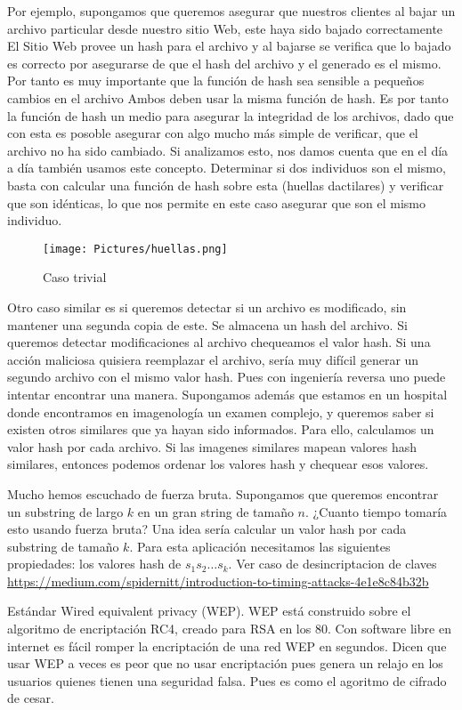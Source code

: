 Por ejemplo, supongamos que queremos asegurar que nuestros clientes al bajar un archivo particular desde nuestro sitio Web, este haya sido bajado correctamente
El Sitio Web provee un hash para el archivo y al bajarse se verifica que lo bajado es correcto por asegurarse de que el hash del archivo y el generado es el mismo.
Por tanto es muy importante que la función de hash sea sensible a pequeños cambios en el archivo
Ambos deben usar la misma función de hash.
Es por tanto la función de hash un medio para asegurar la integridad de los archivos, dado que con esta es posoble asegurar con algo mucho más simple de verificar, que el archivo no ha sido cambiado. 
Si analizamos esto, nos damos cuenta que en el día a día también usamos este concepto. Determinar si dos individuos son el mismo, basta con calcular una función de hash sobre esta (huellas dactilares) y verificar que son idénticas, lo que nos permite en este caso asegurar que son el mismo individuo. 
\begin{figure}[h!]
    \centering
    \texttt{[image: Pictures/huellas.png]}
    \caption{Caso trivial}
    \label{fig:my_label}
\end{figure}
Otro caso similar es si queremos detectar si un archivo es modificado, sin mantener una segunda copia de este. Se almacena un hash del archivo. Si queremos detectar modificaciones al archivo chequeamos el valor hash. Si una acción maliciosa quisiera reemplazar el archivo, sería muy difícil generar un segundo archivo con el mismo valor hash. Pues con ingeniería reversa uno puede intentar encontrar una manera. 
Supongamos además que estamos en un hospital donde encontramos en imagenología un examen complejo, y queremos saber si existen otros similares que ya hayan sido informados. Para ello, calculamos un valor hash por cada archivo. Si las imagenes similares mapean valores hash similares, entonces podemos ordenar los valores hash y chequear esos valores. 

Mucho hemos escuchado de fuerza bruta. Supongamos que queremos encontrar un substring de largo $k$ en un gran string de tamaño $n$. ¿Cuanto tiempo tomaría esto usando fuerza bruta? Una idea sería calcular un valor hash por cada substring de tamaño $k$. Para esta aplicación necesitamos las siguientes propiedades: los valores hash de $s_1 s_2 \ldots s_k$. 
Ver caso de desincriptacion de  claves \url{https://medium.com/spidernitt/introduction-to-timing-attacks-4e1e8c84b32b}

Estándar Wired equivalent privacy (WEP). WEP está construido sobre el algoritmo de encriptación RC4, creado para RSA en los 80. Con software libre en internet es fácil romper la encriptación de una red WEP en segundos. Dicen que usar WEP a veces es peor que no usar encriptación pues genera un relajo en los usuarios quienes tienen una seguridad falsa. Pues es como el agoritmo de cifrado de cesar. 

